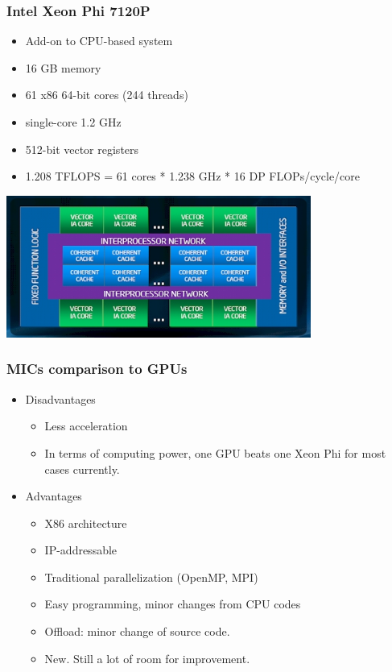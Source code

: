 \documentclass[10pt,t]{beamer}
\begin{document}
\begin{frame}
  \frametitle{Intel Xeon Phi 7120P}
  \begin{itemize}
  \item Add-on to CPU-based system
  \item 16 GB memory
  \item 61 x86 64-bit cores (244 threads)
  \item single-core 1.2 GHz
  \item 512-bit vector registers
  \item 1.208 TFLOPS = 61 cores * 1.238 GHz * 16 DP FLOPs/cycle/core
  \end{itemize}
  \begin{center}
    \includegraphics[width=0.75\textwidth]{./intel_hpc_mica}
  \end{center}
\end{frame}

\begin{frame}
  \frametitle{MICs comparison to GPUs}
  \begin{itemize}
  \item Disadvantages
    \begin{itemize}
    \item Less acceleration
    \item In terms of computing power, one GPU beats one Xeon Phi
      for most cases currently.
    \end{itemize}
  \item Advantages
    \begin{itemize}
    \item X86 architecture
    \item IP-addressable
    \item Traditional parallelization (OpenMP, MPI)
    \item Easy programming, minor changes from CPU codes
    \item Offload: minor change of source code.
    \item New. Still a lot of room for improvement.
    \end{itemize}
  \end{itemize}
\end{frame}
\end{document}
